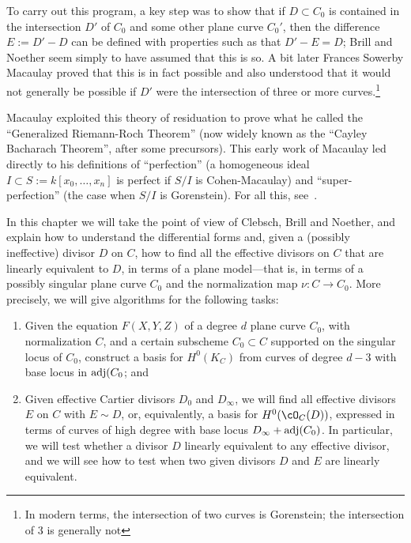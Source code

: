 To carry out this program, a key step was to show that if $D\subset C_0$ is contained in the intersection
$D'$ of $C_0$ and some other plane curve $C_0'$, then the difference 
$E := D'-D$ can be defined with properties such as that $D'-E = D$; Brill and Noether seem simply to have assumed that this is so. A bit later Frances Sowerby Macaulay proved that this is in fact possible  and also understood that it would not generally be possible if $D'$ were the intersection of three or more curves.\footnote{In modern terms, the intersection of two curves is Gorenstein; the intersection of 3 is generally not}

Macaulay exploited this theory of residuation  to prove what he called the ``Generalized Riemann-Roch Theorem'' (now widely known as the ``Cayley Bacharach Theorem'', after some precursors). This early work of Macaulay led directly to his definitions of  ``perfection'' (a homogeneous ideal
$I  \subset S:= k[x_0, \dots, x_n]$ is perfect if $S/I$ is Cohen-Macaulay) and ``super-perfection'' (the case when $S/I$ is
Gorenstein). For all this, see~\cite{Eisenbud-Gray}.

In this chapter we will take the point of view of Clebsch, Brill and Noether, and explain how to understand 
the differential forms and, given a (possibly ineffective) divisor $D$ on $C$, how to find all the 
effective divisors on $C$ that are linearly equivalent to $D$, in terms of a plane model---that is, 
in terms of a possibly singular plane curve $C_{0}$ and the normalization map $\nu: C\to C_{0}$.
More precisely, we will give algorithms for the following tasks:
 
\begin{enumerate}
\item Given the equation $F(X,Y,Z)$ of a degree $d$ plane curve $C_0$, with normalization $C$,
and a certain subscheme $C_{0}\subset C$ supported on the singular locus of $C_{0}$,
construct a basis for $H^0(K_C)$ from curves of degree $d-3$ with base locus in $\adj(C_{0}$; and

\item  Given effective Cartier divisors $D_{0}$ and $D_{\infty}$, we will  find all effective divisors $E$ on $C$ with $E \sim D$, or, equivalently, a basis for $H^0(\cO_C(D))$, expressed in terms of curves of high degree with  base locus $D_{\infty}+\adj(C_{0})$. In particular, we will test whether a divisor $D$ linearly equivalent to any effective divisor, and we will see how to test when two given divisors $D$ and $E$ are linearly equivalent. 
\end{enumerate}

